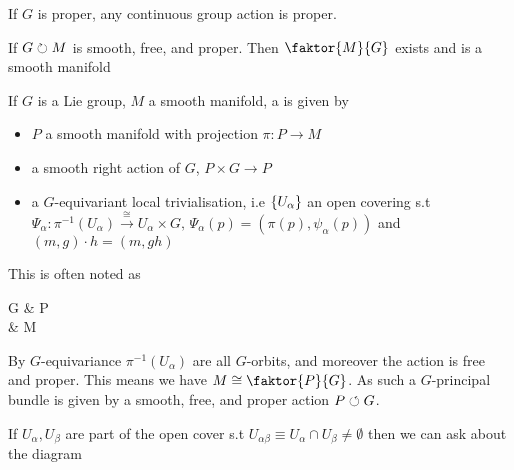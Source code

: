 \documentclass{article}
\begin{document}
\begin{prop}
If $G$ is proper, any continuous group action is proper. 
\end{prop}

\begin{lemma}
If $G \circlearrowright M$ is smooth, free, and proper. Then $\faktor{M}{G}$ exists and is a smooth manifold
\end{lemma}

\begin{definition}
If $G$ is a Lie group, $M$ a smooth manifold, a  is given by 
\begin{itemize}
    \item $P$ a smooth manifold with projection $\pi:P \to M$
    \item a smooth right action of $G$, $P \times G \to P$
    \item a $G$-equivariant local trivialisation, i.e $\left\{ U_\alpha \right\}$ an open covering s.t $\Psi_\alpha : \pi^{-1}(U_\alpha) \overset{\cong}{\to} U_\alpha \times G, \, \Psi_\alpha(p) = (\pi(p),\psi_\alpha(p))$ and $(m,g) \cdot h = (m,gh)$
\end{itemize}
This is often noted as 
\begin{tkz}
G \arrow[r] & P \arrow[d,"\pi"] \\ & M
\end{tkz}
\end{definition}

\begin{remark}
By $G$-equivariance $\pi^{-1}(U_\alpha)$ are all $G$-orbits, and moreover the action is free and proper. This means we have $M \cong \faktor{P}{G}$. As such a $G$-principal bundle is given by a smooth, free, and proper action $P \circlearrowleft G$. 
\end{remark}

If $U_\alpha,U_\beta$ are part of the open cover s.t $U_{\alpha\beta} \equiv U_\alpha \cap U_\beta \neq \emptyset$ then we can ask about the diagram
\begin{center}
\end{center}
\end{document}
